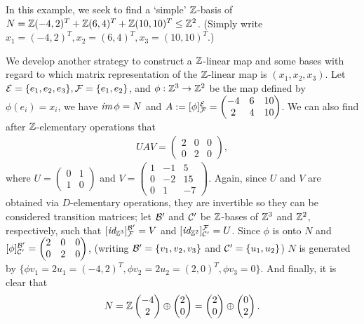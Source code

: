 \begin{exmp}
    In this example, we seek to find a `simple' ${\mathbb{Z}}$-basis of $N={\mathbb{Z}}(-4, 2)^T+{\mathbb{Z}}(6, 4)^T+{\mathbb{Z}}(10, 10)^T\leq{\mathbb{Z}}^2$.
    (Simply write $x_1=(-4, 2)^T, x_2=(6, 4)^T, x_3=(10, 10)^T$.)
    
    We develop another strategy to construct a ${\mathbb{Z}}$-linear map and some bases with regard to which matrix representation of the ${\mathbb{Z}}$-linear map is $(x_1, x_2, x_3)$.
    Let ${\mathcal{E}}=\{e_1, e_2, e_3\}, {\mathcal{F}}=\{e_1, e_2\}$, and $\phi: {\mathbb{Z}}^3\rightarrow{\mathbb{Z}}^2$ be the map defined by $\phi(e_i)=x_i$, we have $\textit{im\,}\phi=N$ and $A:=[\phi]^{\mathcal{E}}_{\mathcal{F}}=\begin{pmatrix}
        -4&6&10\\2&4&10
    \end{pmatrix}$.
    We can also find after ${\mathbb{Z}}$-elementary operations that
    \begin{align*}
        UAV=\begin{pmatrix}
            2&0&0\\0&2&0
        \end{pmatrix},
    \end{align*}
    where $U=\begin{pmatrix}
        0&1\\1&0
    \end{pmatrix}$ and $V=\begin{pmatrix}
        1&-1&5\\0&-2&15\\0&1&-7
    \end{pmatrix}$.
    \color{teal}Again, since $U$ and $V$ are obtained via $D$-elementary operations, they are invertible so they can be considered transition matrices; let ${\mathcal{B}}'$ and ${\mathcal{C}}'$ be ${\mathbb{Z}}$-bases of ${\mathbb{Z}}^3$ and ${\mathbb{Z}}^2$, respectively, such that $[\textit{id}_{{\mathbb{Z}}^3}]^{{\mathcal{B}}'}_{\mathcal{F}}=V$ and $[\textit{id}_{{\mathbb{Z}}^2}]^{\mathcal{F}}_{{\mathcal{C}}'}=U$. \color{black}
    Since $\phi$ is onto $N$ and $[\phi]^{{\mathcal{B}}'}_{{\mathcal{C}}'}=\begin{pmatrix}
        2&0&0\\0&2&0
    \end{pmatrix}$, (writing ${\mathcal{B}}'=\{v_1, v_2, v_3\}$ and ${\mathcal{C}}'=\{u_1, u_2\}$) $N$ is generated by $\{\phi v_1=2u_1=(-4, 2)^T, \phi v_2=2u_2=(2, 0)^T, \phi v_3=0\}$.
    And finally, it is clear that
    \begin{align*}
        N={\mathbb{Z}}\begin{pmatrix}
            -4\\2
        \end{pmatrix}\oplus\begin{pmatrix}
            2\\0
        \end{pmatrix}=\begin{pmatrix}
            2\\0
        \end{pmatrix}\oplus\begin{pmatrix}
            0\\2
        \end{pmatrix}.
    \end{align*}
\end{exmp}